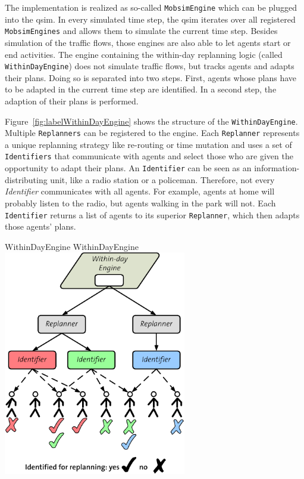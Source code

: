 The implementation is realized as so-called \lstinline{MobsimEngine} which can be plugged into the \gls{qsim}. In every simulated time step, the \gls{qsim} iterates over all registered \lstinline{MobsimEngines} and allows them to simulate the current time step. Besides simulation of the traffic flows, those engines are also able to let agents start or end activities. The engine containing the within-day replanning logic (called \lstinline{WithinDayEngine}) does not simulate traffic flows, but tracks agents and adapts their plans. Doing so is separated into two steps. First, agents whose plans have to be adapted in the current time step are identified. In a second step, the adaption of their plans is performed. 
%

Figure~\ref{fig:labelWithinDayEngine} shows the structure of the \lstinline{WithinDayEngine}. Multiple \lstinline{Replanners} can be registered to the engine. Each \lstinline{Replanner} represents a unique replanning strategy like re-routing or time mutation and uses a set of \lstinline{Identifiers} that communicate with agents and select those who are given the opportunity to adapt their plans. An \lstinline{Identifier} can be seen as an information-distributing unit, like a radio station or a policeman. Therefore, not every \emph{Identifier} communicates with all agents. For example, agents at home will probably listen to the radio, but agents walking in the park will not. Each \lstinline{Identifier} returns a list of agents to its superior \lstinline{Replanner}, which then adapts those agents' plans.

\createfigure%
{WithinDayEngine}%
{WithinDayEngine}%
{\label{fig:labelWithinDayEngine}}%
{\includegraphics[width=8.0cm, angle=0]{extending/figures/WithinDayReplanning/ReplanningManager}}%
{}
%

